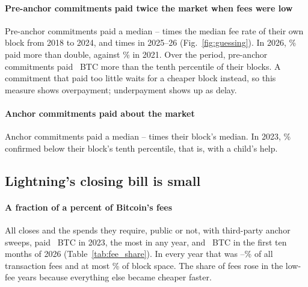 \paragraph{Pre-anchor commitments paid twice the market when fees were low}
Pre-anchor commitments paid a median \LegacyMedRatioEarlyMin--\LegacyMedRatioEarlyMax{} times the median fee rate of
their own block from 2018 to 2024, and \LegacyMedRatioTwentySix{} times in 2025--26 (Fig.~\ref{fig:guessing}). In
2026, \LegacyOverTwoPctTwentySix\% paid more than double, against \LegacyOverTwoPctTwentyOne\% in 2021. Over the
period, pre-anchor commitments paid \LegacyOverBtcAll~BTC more than the tenth percentile of their blocks. A commitment
that paid too little waits for a cheaper block instead, so this measure shows overpayment; underpayment shows up as
delay.

\paragraph{Anchor commitments paid about the market}
Anchor commitments paid a median \AnchorMedRatioMin--\AnchorMedRatioMax{} times their block's median. In 2023,
\AnchorBelowPTenPctTwentyThree\% confirmed below their block's tenth percentile, that is, with a child's help.

\subsection{Lightning's closing bill is small}

{\setlength{\tabcolsep}{2.5pt}}

\paragraph{A fraction of a percent of Bitcoin's fees}
All closes and the spends they require, public or not, with third-party anchor sweeps, paid \BillBtcTwentyThree~BTC
in 2023, the most in any year, and \BillBtcTwentySix~BTC in the first ten months of 2026 (Table~\ref{tab:fee_share}). In
every year that was \BillFeePctMin--\BillFeePctMax\% of all transaction fees and at most \BillVbPctMax\% of block
space. The share of fees rose in the low-fee years because everything else became cheaper faster.
